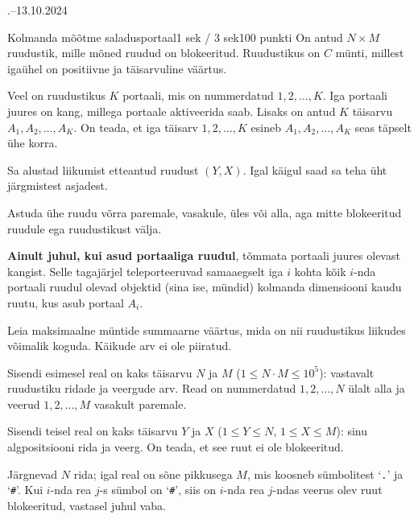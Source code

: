 \documentclass[a4paper,11pt]{article}
\begin{document}
\begin{ol}{\eio}{.--13.10.2024}{\yle}{}
  \begin{yl}{5}{Kolmanda mõõtme saladus}{portaal}{1 sek / 3 sek}{100 punkti}    
    On antud $N \times M$ ruudustik, mille mõned ruudud on blokeeritud.
    Ruudustikus on $C$ münti, millest igaühel on positiivne ja täisarvuline
    väärtus.

    Veel on ruudustikus $K$ portaali, mis on nummerdatud $1, 2, \ldots, K$.
    Iga portaali juures on kang, millega portaale aktiveerida saab.
    Lisaks on antud $K$ täisarvu $A_1, A_2, \ldots, A_K$. On teada, et iga
    täisarv $1, 2, \ldots, K$ esineb $A_1, A_2, \ldots, A_K$ seas täpselt
    ühe korra.

    Sa alustad liikumist etteantud ruudust $(Y, X)$. Igal käigul saad sa
    teha üht järgmistest asjadest.
    \begin{xitem}
    \item Astuda ühe ruudu võrra paremale, vasakule, üles või alla, aga
      mitte blokeeritud ruudule ega ruudustikust välja.
    \item \textbf{Ainult juhul, kui asud portaaliga ruudul}, tõmmata portaali
      juures olevast kangist. Selle tagajärjel teleporteeruvad samaaegselt
      iga $i$ kohta kõik $i$-nda portaali ruudul olevad objektid (sina ise,
      mündid) kolmanda dimensiooni kaudu ruutu, kus asub portaal $A_i$.
    \end{xitem}
    Leia maksimaalne müntide summaarne väärtus, mida on nii ruudustikus liikudes
    võimalik koguda. Käikude arv ei ole piiratud.

    \sis Sisendi esimesel real on kaks täisarvu $N$ ja $M$ ($1 \le N \cdot M \le 10^5$):
    vastavalt ruudustiku ridade ja veergude arv. Read on nummerdatud $1, 2, \ldots, N$
    ülalt alla ja veerud $1, 2, \ldots, M$ vasakult paremale.

    Sisendi teisel real on kaks täisarvu $Y$ ja $X$ ($1 \le Y \le N$, $1 \le X \le M$):
    sinu algpositsiooni rida ja veerg. On teada, et see ruut ei ole blokeeritud.

    Järgnevad $N$ rida; igal real on sõne pikkusega $M$, mis koosneb sümbolitest
    `\verb/./' ja `\verb/#/'. Kui $i$-nda rea $j$-s sümbol on `\verb/#/', siis on
    $i$-nda rea $j$-ndas veerus olev ruut blokeeritud, vastasel juhul vaba.


\end{yl}
\end{ol}
\end{document}
